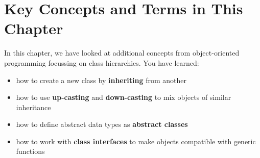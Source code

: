 \documentclass[fsharpNotes.tex]{subfiles}
\begin{document}

\section{Key Concepts and Terms in This Chapter}
In this chapter, we have looked at additional concepts from object-oriented programming focussing on class hierarchies. You have learned:
\begin{itemize}
\item how to create a new class by \textbf{inheriting} from another
\item how to use \textbf{up-casting} and \textbf{down-casting} to mix objects of similar inheritance
\item how to define abstract data types as \textbf{abstract classes}
\item how to work with \textbf{class interfaces} to make objects compatible with generic functions
\end{itemize}
\end{document}
